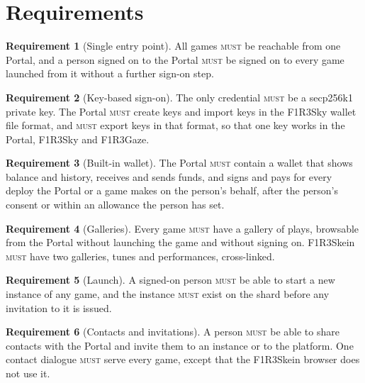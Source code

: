 \documentclass[11pt]{article}
\theoremstyle{definition}
\newtheorem{requirement}{Requirement}
\theoremstyle{remark}
\newcommand{\MUST}{\textsc{must}}
\newcommand{\Sky}{F1R3Sky}
\newcommand{\Gz}{F1R3Gaze}
\begin{document}
\section{Requirements}\label{sec:req}

\begin{requirement}[Single entry point]\label{req:entry}
All games \MUST{} be reachable from one Portal, and a person signed on to the Portal
\MUST{} be signed on to every game launched from it without a further sign-on step.
\end{requirement}

\begin{requirement}[Key-based sign-on]\label{req:key}
The only credential \MUST{} be a secp256k1 private key. The Portal \MUST{} create
keys and import keys in the \Sky{} wallet file format, and \MUST{} export keys in
that format, so that one key works in the Portal, \Sky{} and \Gz{}.
\end{requirement}

\begin{requirement}[Built-in wallet]\label{req:wallet}
The Portal \MUST{} contain a wallet that shows balance and history, receives and
sends funds, and signs and pays for every deploy the Portal or a game makes on the
person's behalf, after the person's consent or within an allowance the person has
set.
\end{requirement}

\begin{requirement}[Galleries]\label{req:gallery}
Every game \MUST{} have a gallery of plays, browsable from the Portal without
launching the game and without signing on. F1R3Skein \MUST{} have two galleries,
tunes and performances, cross-linked.
\end{requirement}

\begin{requirement}[Launch]\label{req:launch}
A signed-on person \MUST{} be able to start a new instance of any game, and the
instance \MUST{} exist on the shard before any invitation to it is issued.
\end{requirement}

\begin{requirement}[Contacts and invitations]\label{req:invite}
A person \MUST{} be able to share contacts with the Portal and invite them to an
instance or to the platform. One contact dialogue \MUST{} serve every game, except
that the F1R3Skein browser does not use it.
\end{requirement}
\end{document}
